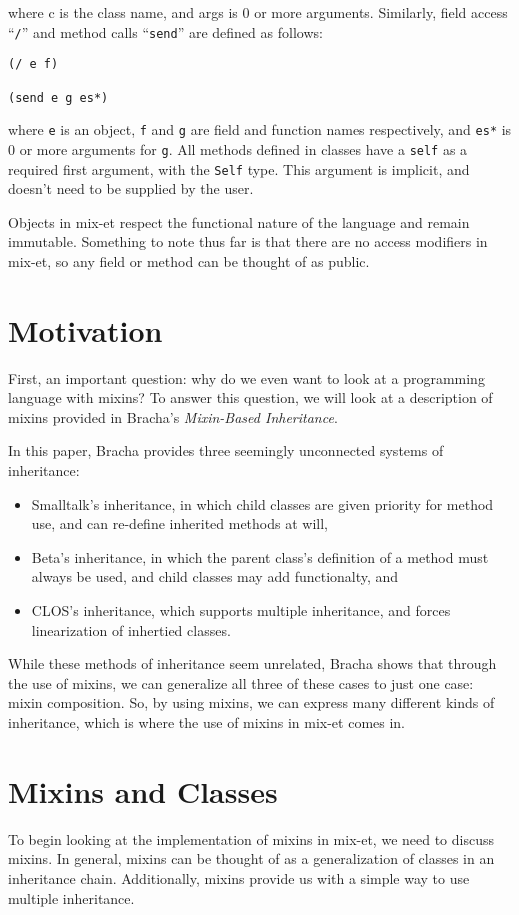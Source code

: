 \documentclass{article}
\begin{document}
where c is the class name, and args is 0 or more arguments. Similarly, field access ``\verb|/|'' and method calls ``\verb|send|'' are defined as follows:
\begin{verbatim}
(/ e f)

(send e g es*)
\end{verbatim}
where \verb|e| is an object, \verb|f| and \verb|g| are field and function names respectively, and \verb|es*| is 0 or more arguments for \verb|g|.
All methods defined in classes have a \verb|self| as a required first argument, with the \verb|Self| type. This argument is implicit, and doesn't need to be supplied by the user.
\par
Objects in mix-et respect the functional nature of the language and remain immutable. Something to note thus far is that there are no access modifiers in mix-et, so any field or method can be thought of as public.

\section*{Motivation} %
First, an important question: why do we even want to look at a programming language with mixins? To answer this question, we will look at a description of mixins provided in Bracha's \textit{Mixin-Based Inheritance}.

In this paper, Bracha provides three seemingly unconnected systems of inheritance:
\begin{itemize}
\item Smalltalk's inheritance, in which child classes are given priority for method use, and can re-define inherited methods at will,

\item Beta's inheritance, in which the parent class's definition of a method must always be used, and child classes may add functionalty, and

\item CLOS's inheritance, which supports multiple inheritance, and forces linearization of inhertied classes.

\end{itemize}
While these methods of inheritance seem unrelated, Bracha shows that through the use of mixins, we can generalize all three of these cases to just one case: mixin composition. So, by using mixins, we can express many different kinds of inheritance, which is where the use of mixins in mix-et comes in.

\section*{Mixins and Classes}
To begin looking at the implementation of mixins in mix-et, we need to discuss mixins. In general, mixins can be thought of as a generalization of classes in an inheritance chain.
Additionally, mixins provide us with a simple way to use multiple inheritance\cite{bracha1990}.
\end{document}
